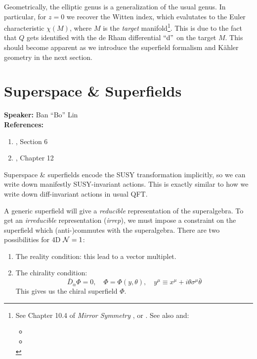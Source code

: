 \documentclass[a4paper
	,10pt
]{article}
\newcommand{\speaker}[1]{\noindent\textbf{Speaker:} #1}
\newcommand{\references}[1]{\noindent\textbf{References:} #1}
\begin{document}
	Geometrically, the elliptic genus is a generalization of the usual genus. In particular, for $z = 0$ we recover the Witten index, which evalutates to the Euler characteristic $\chi(M)$, where $M$ is the \textit{target} manifold\footnote{
		See Chapter 10.4 of \textit{Mirror Symmetry} \cite{Hori:2003ic}, or \textcite{Witten:1982df}. See also \cite{MauricioStuff} and:
		\begin{itemize}[
			topsep=.5ex,noitemsep,
			leftmargin=4em
		]
		\item {}
		\item {}
		\end{itemize}
	}. This is due to the fact that $Q$ gets identified with the de Rham differential $\text{``$\dd$''}$ on the target $M$. This should become apparent as we introduce the superfield formalism and K\"ahler geometry in the next section. 
	
	
	
	
\section{Superspace \& Superfields}
	\speaker{Ban ``Bo'' Lin}\\
	\references{
	\begin{enumerate}[noitemsep,topsep=0pt]
	\item \textcite{Argyres:1996abc}, Section 6
	\item \citetitle{Hori:2003ic} \cite{Hori:2003ic}, Chapter 12
	\end{enumerate}
	}\vspace{.5\baselineskip}
	
	Superspace \& superfields encode the SUSY transformation implicitly, so we can write down manifestly SUSY-invariant actions. This is exactly similar to how we write down diff-invariant actions in usual QFT.
	
	A generic superfield will give a \textit{reducible} representation of the superalgebra. To get an \textit{irreducible} representation (\textit{irrep}), we must impose a constraint on the superfield which (anti-)commutes with the superalgebra. There are two possibilities for 4D $\mathcal{N} = 1$:
	\begin{enumerate}[noitemsep]
	\item The reality condition: this lead to a vector multiplet.
	\item The chirality condition:
	\begin{equation}
		\bar{D}_{\dot{\alpha}} \Phi = 0,
	\quad
		\Phi = \Phi(y,\theta),
	\quad
		y^\mu \equiv x^\mu
			+ i\theta \sigma^\mu \bar{\theta}
	\end{equation}
	This gives us the chiral superfield $\Phi$. 
	\end{enumerate}
	
\end{document}

